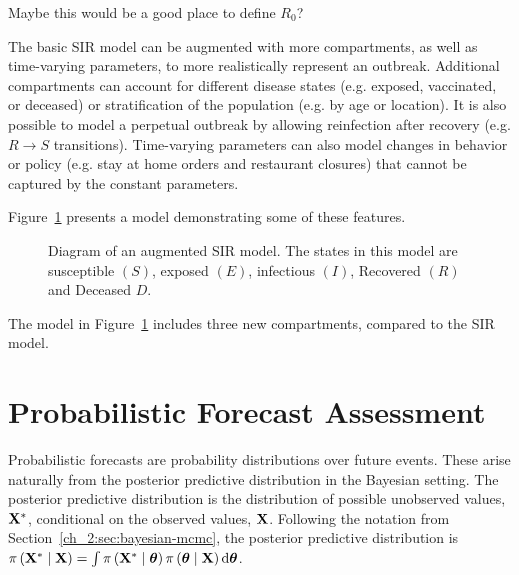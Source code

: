 Maybe this would be a good place to define \( R_0 \)?

The basic SIR model can be augmented with more compartments, as well as time-varying parameters, to more realistically represent an outbreak.
Additional compartments can account for different disease states (e.g. exposed, vaccinated, or deceased) or stratification of the population (e.g. by age or location).
It is also possible to model a perpetual outbreak by allowing reinfection after recovery (e.g. \(R \to S\) transitions).
Time-varying parameters can also model changes in behavior or policy (e.g. stay at home orders and restaurant closures) that cannot be captured by the constant parameters.

Figure~\ref{fig:ch_2:SEIRDS_diagram} presents a model demonstrating some of these features.

\begin{figure}
    \centering
    \caption{Diagram of an augmented SIR model.
    The states in this model are susceptible \( (S) \), exposed \( (E) \), infectious \( (I) \), Recovered \( (R) \) and Deceased \( D \).}
    \label{fig:ch_2:SEIRDS_diagram}
\end{figure}

The model in Figure~\ref{fig:ch_2:SEIRDS_diagram} includes three new compartments, compared to the SIR model.


\section{Probabilistic Forecast Assessment}
\label{sec:forecasting_techniques_and_assessment}

Probabilistic forecasts are probability distributions over future events.
These arise naturally  from the posterior predictive distribution in the Bayesian setting.
The posterior predictive distribution is the distribution of possible unobserved values, \( \mathbf{X}^* \), conditional on the observed values, \( \mathbf{X} \).
Following the notation from Section~\ref{ch_2:sec:bayesian-mcmc}, the posterior predictive distribution is \( \pi \left( \mathbf{X}^* \mid \mathbf{X} \right) = \int \pi \left( \mathbf{X}^* \mid \boldsymbol{\theta} \right) \pi \left( \boldsymbol{\theta} \mid \mathbf{X} \right) \mathrm{d} \boldsymbol{\theta} \).

